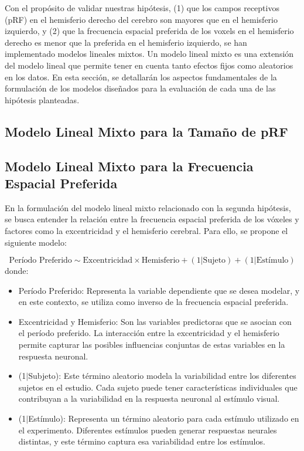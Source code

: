 Con el propósito de validar nuestras hipótesis, (1) que los campos receptivos (pRF) en el hemisferio derecho del cerebro son mayores que en el hemisferio izquierdo, y (2) que la frecuencia espacial preferida de los voxels en el hemisferio derecho es menor que la preferida en el hemisferio izquierdo, se han implementado modelos lineales mixtos. Un modelo lineal mixto es una extensión del modelo lineal que permite tener en cuenta tanto efectos fijos como aleatorios en los datos. En esta sección, se detallarán los aspectos fundamentales de la formulación de los modelos diseñados para la evaluación de cada una de las hipótesis planteadas.

\subsection{Modelo Lineal Mixto para la Tama\~no de pRF}

\subsection{Modelo Lineal Mixto para la Frecuencia Espacial Preferida}

En la formulación del modelo lineal mixto relacionado con la segunda hip\'otesis, se busca entender la relación entre la frecuencia espacial preferida de los vóxeles y factores como la excentricidad y el hemisferio cerebral. Para ello, se propone el siguiente modelo:

\begin{equation}
	\text{Período Preferido} \sim  \text{Excentricidad} \times \text{Hemisferio} + (1|\text{Sujeto}) + (1|\text{Estímulo})	
\end{equation}
donde:
\begin{itemize}
	\item Período Preferido: Representa la variable dependiente que se desea modelar, y en este contexto, se utiliza como inverso de la frecuencia espacial preferida.
	
	\item Excentricidad y Hemisferio: Son las variables predictoras que se asocian con el período preferido. La interacción entre la excentricidad y el hemisferio permite capturar las posibles influencias conjuntas de estas variables en la respuesta neuronal.
	
	\item (1$|$Subjeto): Este término aleatorio modela la variabilidad entre los diferentes sujetos en el estudio. Cada sujeto puede tener características individuales que contribuyan a la variabilidad en la respuesta neuronal al estímulo visual.

	\item (1$|$Est\'imulo): Representa un término aleatorio para cada estímulo utilizado en el experimento. Diferentes estímulos pueden generar respuestas neurales distintas, y este término captura esa variabilidad entre los estímulos.
	
\end{itemize}

